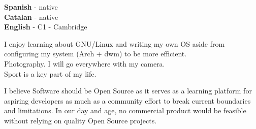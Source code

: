 \documentclass[9pt]{developercv} %
\begin{document}

\begin{minipage}[t]{0.3\textwidth}
	\vspace{-\baselineskip} %

	
	\textbf{Spanish} - native\\
	\textbf{Catalan} - native\\
	\textbf{English} - C1 - Cambridge
\end{minipage}
\hfill
\begin{minipage}[t]{0.3\textwidth}
	\vspace{-\baselineskip} %
	
	I enjoy learning about GNU/Linux and writing my own OS aside from configuring my system (Arch + dwm) to be more efficient.\\
	Photography. I will go everywhere with my camera.\\
	Sport is a key part of my life.\\
\end{minipage}
\hfill
\begin{minipage}[t]{0.3\textwidth}
	\vspace{-\baselineskip} %
	
	I believe Software should be Open Source as it serves as a learning platform for aspiring developers as much as a community effort to break current boundaries and limitations. In our day and age, no commercial product would be feasible without relying on quality Open Source projects.
\end{minipage}

\end{document}
